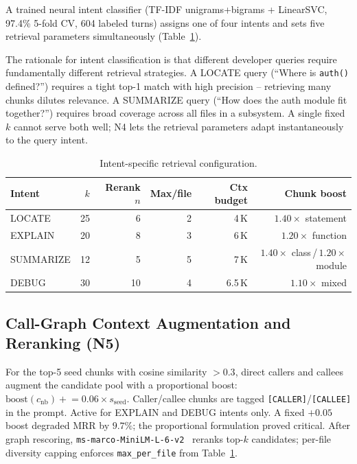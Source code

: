 \documentclass[runningheads]{llncs}
\begin{document}
A trained neural intent classifier (TF-IDF unigrams+bigrams + LinearSVC,
97.4\% 5-fold CV, 604 labeled turns) assigns one of four intents and sets
five retrieval parameters simultaneously (Table~\ref{tab:intent_config}).

The rationale for intent classification is that different developer queries
require fundamentally different retrieval strategies. A LOCATE query
(``Where is \texttt{auth()} defined?'') requires a tight top-1 match with
high precision -- retrieving many chunks dilutes relevance. A SUMMARIZE
query (``How does the auth module fit together?'') requires broad coverage
across all files in a subsystem. A single fixed $k$ cannot serve both well;
N4 lets the retrieval parameters adapt instantaneously to the query intent.

\begin{table}[H]
\centering
\caption{Intent-specific retrieval configuration.}
\label{tab:intent_config}
\footnotesize
\begin{tabular}{lrrrrr}
\toprule
Intent & $k$ & Rerank $n$ & Max/file & Ctx budget & Chunk boost \\
\midrule
LOCATE    & 25 & 6  & 2 & 4\,K  & $1.40\times$ statement \\
EXPLAIN   & 20 & 8  & 3 & 6\,K  & $1.20\times$ function  \\
SUMMARIZE & 12 & 5  & 5 & 7\,K  & $1.40\times$ class\,/\,$1.20\times$ module \\
DEBUG     & 30 & 10 & 4 & 6.5\,K& $1.10\times$ mixed     \\
\bottomrule
\end{tabular}
\end{table}

\subsection{Call-Graph Context Augmentation and Reranking (N5)}

For the top-5 seed chunks with cosine similarity $>0.3$, direct callers
and callees augment the candidate pool with a proportional boost:
$\text{boost}(c_{\text{nb}}) \mathrel{+}= 0.06 \times s_{\text{seed}}$.
Caller/callee chunks are tagged \texttt{[CALLER]}/\texttt{[CALLEE]} in the prompt.
Active for EXPLAIN and DEBUG intents only. A fixed $+0.05$ boost degraded
MRR by $9.7\%$; the proportional formulation proved critical.
After graph rescoring, \texttt{ms-marco-MiniLM-L-6-v2}~\cite{reimers2019sentencebert}
reranks top-$k$ candidates; per-file diversity capping enforces
\texttt{max\_per\_file} from Table~\ref{tab:intent_config}.
\end{document}
